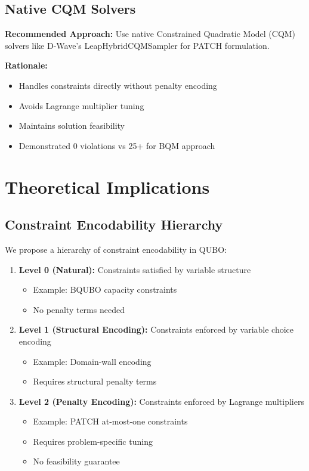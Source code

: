 \documentclass[11pt,a4paper]{article}
\begin{document}
\subsection{Native CQM Solvers}

\textbf{Recommended Approach:} Use native Constrained Quadratic Model (CQM) solvers like D-Wave's LeapHybridCQMSampler for PATCH formulation.

\textbf{Rationale:}
\begin{itemize}
    \item Handles constraints directly without penalty encoding
    \item Avoids Lagrange multiplier tuning
    \item Maintains solution feasibility
    \item Demonstrated 0 violations vs 25+ for BQM approach
\end{itemize}

\section{Theoretical Implications}

\subsection{Constraint Encodability Hierarchy}

We propose a hierarchy of constraint encodability in QUBO:

\begin{enumerate}
    \item \textbf{Level 0 (Natural):} Constraints satisfied by variable structure
        \begin{itemize}
            \item Example: BQUBO capacity constraints
            \item No penalty terms needed
        \end{itemize}
    
    \item \textbf{Level 1 (Structural Encoding):} Constraints enforced by variable choice encoding
        \begin{itemize}
            \item Example: Domain-wall encoding
            \item Requires structural penalty terms
        \end{itemize}
    
    \item \textbf{Level 2 (Penalty Encoding):} Constraints enforced by Lagrange multipliers
        \begin{itemize}
            \item Example: PATCH at-most-one constraints
            \item Requires problem-specific tuning
            \item No feasibility guarantee
        \end{itemize}
\end{enumerate}
\end{document}
